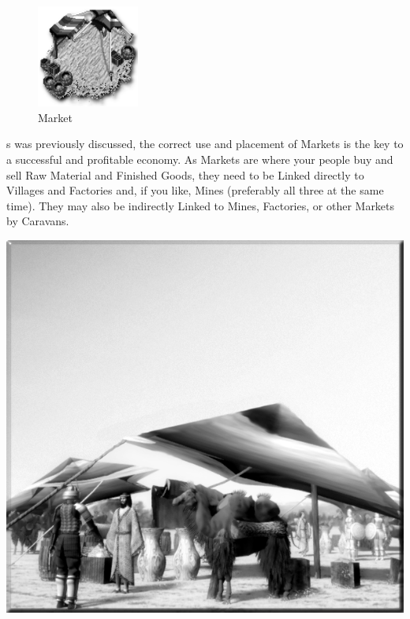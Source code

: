 \begin{figure}
    \vspace{-20pt}
    \begin{center}
        \includegraphics[width=0.3\textwidth]{Imarket} %
        \\ Market
    \end{center}
    \vspace{-30pt} %
\end{figure}



s was previously discussed, the correct use and placement of Markets is the key to a successful and profitable economy. As Markets are where your people buy and sell Raw Material and Finished Goods, they need to be Linked directly to Villages and Factories and, if you like, Mines (preferably all three at the same time). They may also be indirectly Linked to Mines, Factories, or other Markets by Caravans.

\begin{center}
    \includegraphics[width=0.7\linewidth]{Amarket} %
\end{center}

